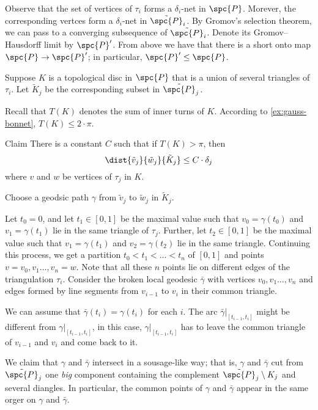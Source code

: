 Observe that the set of vertices of $\tau_i$ forms a $\delta_i$-net in $\spc{P}$.
Morever, the corresponding vertces form a $\delta_i$-net in $\tilde{\spc{P}}_i$.
By Gromov's selection theorem, we can pass to a converging subsequence of $\tilde{\spc{P}}_i$.
Denote its Gromov--Hausdorff limit by $\spc{P}'$.
From above we have that there is a short onto map $\spc{P}\to \spc{P}'$;
in particular, $\spc{P}'\le \spc{P}$.

Suppose $K$ is a topological disc in $\spc{P}$ that is a union of several triangles of $\tau_i$.
Let $\tilde K_j$ be the corresponding subset in $\tilde{\spc{P}}_j$.




Recall that $T(K)$ denotes the sum of inner turns of $K$.
According to \ref{ex:gauss-bonnet}, $T(K)\le 2\cdot\pi$.

\begin{thm}{Claim}
There is a constant $C$ such that if $T(K)>\pi$, then
\[\dist{\tilde v_j}{\tilde w_j}{\tilde K_j}\le C\cdot\delta_j\]
where $v$ and $w$ be vertices of $\tau_j$ in $K$.
\end{thm}

Choose a geodsic path $\gamma$ from $\tilde v_j$ to $\tilde w_j$ in $\tilde K_j$.

Let $t_0=0$, and let $t_1\in[0,1]$ be the maximal value such that $v_0=\gamma(t_0)$ and $v_1=\gamma(t_1)$ lie in the same triangle of $\tau_j$.
Further, let $t_2\in[0,1]$ be the maximal value such that $v_1=\gamma(t_1)$ and $v_2=\gamma(t_2)$ lie in the same triangle.
Continuing this process, we get a partition $t_0<t_1<\dots<t_n$ of $[0,1]$ and points $v=v_0,v_1\dots,v_n=w$.
Note that all these $n$ points lie on different edges of the triangulation $\tau_i$.
Consider the broken local geodesic $\bar\gamma$ with vertices $v_0,v_1\dots,v_n$ and edges formed by line segments from $v_{i-1}$ to $v_i$ in their common triangle.

We can assume that $\bar\gamma(t_i)=\gamma(t_i)$ for each $i$.
The arc $\bar\gamma|_{[t_{i-1},t_i]}$ might be different from $\gamma|_{[t_{i-1},t_i]}$,
in this case, $\gamma|_{[t_{i-1},t_i]}$ has to leave the common triangle of $v_{i-1}$ and $v_i$ and come back to it.

We claim that $\gamma$ and $\bar\gamma$ intersect in a sousage-like way;
that is, $\gamma$ and $\bar\gamma$ cut from $\tilde{\spc{P}}_j$ one \textit{big} component containing the complement $\tilde{\spc{P}}_j\setminus K_j$ and several diangles.
In particular, the common points of $\gamma$ and $\bar\gamma$ appear in the same orger on $\gamma$ and $\bar\gamma$.

